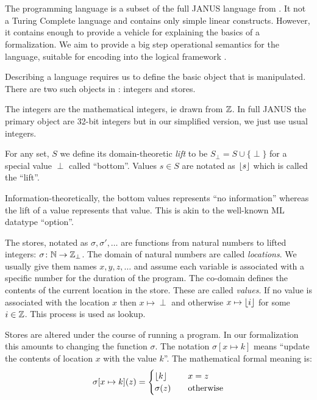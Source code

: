 \chapter{\janusz{}}
\label{chap:janus0}

The \janusz{} programming language is a subset of the full JANUS
language from \cite{glueck+2007}. It not a Turing Complete language and
contains only simple linear constructs. However, it contains enough to
provide a vehicle for explaining the basics of a formalization. We aim
to provide a big step operational semantics for the language, suitable
for encoding into the logical framework \coq{}.

Describing a language requires us to define the basic object that is
manipulated. There are two such objects in \janusz{}: integers and
stores.

The integers are the mathematical integers, ie drawn from $\mathbb{Z}$. In
full JANUS the primary object are 32-bit integers but in our
simplified version, we just use usual integers.
\begin{defn}
  \label{defn-lift}
  For any set, $S$ we define its domain-theoretic \emph{lift} to be
  $S_{\perp} = S \cup \{\perp\} $ for a special value $\perp$ called
  ``bottom''. Values $s \in S$ are notated as $\lfloor s \rfloor$ which is
  called the ``lift''.
\end{defn}
Information-theoretically, the bottom values represents ``no
information'' whereas the lift of a value represents that value. This
is akin to the well-known ML datatype ``option''.

The stores, notated as $\sigma, \sigma', \dotsc$ are functions from
natural numbers to lifted integers: $\sigma \colon \mathbb{N} \to
\mathbb{Z}_{\perp}$. The domain of natural numbers are called
\emph{locations}. We usually give them names $x, y, z, \dotsc$ and
assume each variable is associated with a specific number for the
duration of the program. The co-domain defines the contents of the
current location in the store. These are called \emph{values}. If no
value is associated with the location $x$ then $x \mapsto \perp$ and
otherwise $x \mapsto \lfloor i \rfloor$ for some $i \in \mathbb{Z}$. This process is
used as lookup.

Stores are altered under the course of running a program. In our
formalization this amounts to changing the function
$\sigma$. The notation $\sigma[x \mapsto k]$ means ``update the contents
of location $x$ with the value $k$''. The mathematical formal meaning
is:
\begin{equation*}
  \sigma[x \mapsto k](z) = \begin{cases}
    \lfloor k \rfloor & \quad x = z\\
    \sigma(z)  & \quad \text{otherwise}
  \end{cases}
\end{equation*}

